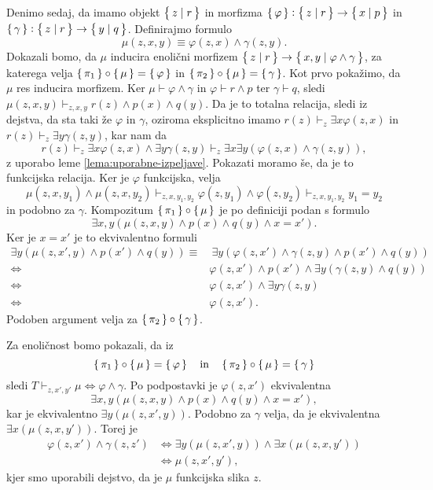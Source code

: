 \documentclass[../kategoricna_logika.tex]{subfiles}
\begin{document}
\begin{dokaz}
\begin{enumerate}[label=(\roman*)]
    Denimo sedaj, da imamo objekt $\left\lbrace\,z \mid r\,\right\rbrace$ in morfizma
    ${\left\lbrace\,\varphi\,\right\rbrace : \left\lbrace\,z \mid r\,\right\rbrace \to \left\lbrace\,x \mid p\,\right\rbrace}$ in
    $\left\lbrace\,\gamma\,\right\rbrace : \left\lbrace\,z \mid r\,\right\rbrace \to \left\lbrace\,y \mid q\,\right\rbrace$.  Definirajmo
    formulo
    \[ \mu(z,x,y) \equiv \varphi(z,x) \land \gamma(z,y). \] Dokazali
    bomo, da $\mu$ inducira enolični morfizem
    $\left\lbrace\,z \mid r\,\right\rbrace \to \left\lbrace\,x,y \mid \varphi \land \gamma\,\right\rbrace$, za
    katerega velja $\left\lbrace\,\pi_1\,\right\rbrace \circ \left\lbrace\,\mu\,\right\rbrace = \left\lbrace\,\varphi\,\right\rbrace$ in
    $\left\lbrace\,\pi_2\,\right\rbrace \circ \left\lbrace\,\mu\,\right\rbrace = \left\lbrace\,\gamma\,\right\rbrace$.  Kot prvo pokažimo,
    da $\mu$ res inducira morfizem.  Ker
    $\mu \vdash \varphi \land \gamma$ in $\varphi \vdash r \land p$
    ter $\gamma \vdash q$, sledi
    $\mu(z,x,y) \vdash_{z,x,y}r(z) \land p(x) \land q(y)$.  Da je to
    totalna relacija, sledi iz dejstva, da sta taki že $\varphi$ in
    $\gamma$, oziroma eksplicitno imamo
    $r(z) \vdash_z \exists x \varphi(z,x)$ in
    $r(z) \vdash_z \exists y \gamma(z,y)$, kar nam da
    \[ r(z) \vdash_z \exists x \varphi(z,x) \land \exists y
      \gamma(z,y) \vdash_z \exists x \exists y (\varphi(z,x) \land
      \gamma(z,y)), \] z uporabo leme \ref{lema:uporabne-izpeljave}.
    Pokazati moramo še, da je to funkcijska relacija.  Ker je
    $\varphi$ funkcijska, velja
    \[ \mu(z,x,y_1) \land \mu(z,x,y_2) \vdash_{z,x,y_1,y_2}
      \varphi(z,y_1) \land \varphi(z,y_2) \vdash_{z,x,y_1,y_2} y_1 =
      y_2 \] in podobno za $\gamma$.  Kompozitum
    $\left\lbrace\,\pi_1\,\right\rbrace \circ \left\lbrace\,\mu\,\right\rbrace$ je po definiciji podan s formulo
    \[ \exists x,y(\mu(z,x,y) \land p(x) \land q(y) \land x=x').\]
    Ker je $x = x'$ je to ekvivalentno formuli
    \begin{align*}
      \exists y(\mu(z,x',y) \land p(x') \land q(y)) \equiv&\ 
                                                            \exists y(\varphi(z,x') \land \gamma(z,y) \land p(x') \land q(y)) \\
      \iff& \varphi(z,x') \land p(x') \land \exists y(\gamma(z,y) \land q(y)) \\
      \iff& \varphi(z,x') \land \exists y \gamma(z,y) \\
      \iff& \varphi(z,x').
    \end{align*}
    Podoben argument velja za $\left\lbrace\,\pi_2\,\right\rbrace \circ \left\lbrace\,\gamma\,\right\rbrace$.

    Za enoličnost bomo pokazali, da iz
    \[\left\lbrace\,\pi_1\,\right\rbrace \circ \left\lbrace\,\mu\,\right\rbrace = \left\lbrace\,\varphi\,\right\rbrace\quad \text{in}\quad
    \left\lbrace\,\pi_2\,\right\rbrace \circ \left\lbrace\,\mu\,\right\rbrace = \left\lbrace\,\gamma\,\right\rbrace\]
    sledi
    $T \vdash_{z,x',y'} \mu \iff \varphi \land \gamma$.  Po
    podpostavki je $\varphi(z,x')$ ekvivalentna
\[ \exists x,y(\mu(z,x,y) \land p(x) \land q(y) \land x=x'),\]
    kar je
    ekvivalentno $\exists y(\mu(z,x',y))$.  Podobno za $\gamma$ velja,
    da je ekvivalentna $\exists x(\mu(z,x,y'))$. Torej je
    \begin{align*}
      \varphi(z,x') \land \gamma(z,z') &\iff \exists y(\mu(z,x',y)) \land \exists x(\mu(z,x,y')) \\
                                       &\iff \mu(z,x',y'),
    \end{align*}
    kjer smo uporabili dejstvo, da je $\mu$ funkcijska slika $z$.


\end{enumerate}
\end{dokaz}
\end{document}
